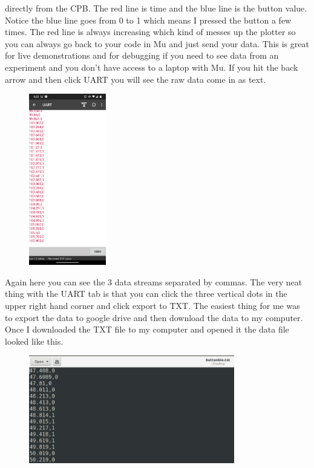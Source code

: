 directly from the CPB. The red line is time and the blue line is the
button value. Notice the blue line goes from 0 to 1 which means I
pressed the button a few times. The red line is always increasing
which kind of messes up the plotter so you can always go back to your
code in Mu and just send your data. This is great for live demonstrations and for
debugging if you need to see data from an experiment and you don't
have access to a laptop with Mu. If you hit the back arrow and then
click UART you will see the raw data come in as text. 
\begin{figure}[H]
  \begin{center}
    \includegraphics[width=0.3\textwidth]{Figures/phoneapp4.png}
  \end{center}
\end{figure}
Again here you can see the 3 data streams separated by commas. The
very neat thing with the UART tab is that you can click the three
vertical dots in the upper right hand corner and click export to
TXT. The easiest thing for me was to export the data to google drive
and then download the data to my computer. Once I downloaded the TXT file to my
computer and opened it the data file looked like this. 
\begin{figure}[H]
  \begin{center}
    \includegraphics[width=0.8\textwidth]{Figures/csv_fileapp.png}
  \end{center}
\end{figure}

